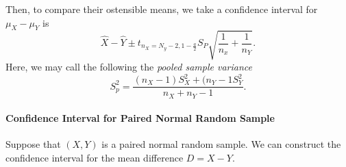 Then, to compare their ostensible means, we take a confidence interval for
\(\mu_X - \mu_Y\) is \[
  \hat{X} - \hat{Y} \pm t_{n_X = N_y - 2, 1 - \frac{a}{2}} S_P \sqrt{\frac{1}{n_x} + \frac{1}{n_Y}} 
.\] 
Here, we may call the following the \textit{pooled sample variance} \[
  S_p^2 = \frac{(n_X - 1)S^2_X + (n_Y - 1S^2_Y}{n_X + n_Y - 1}
.\] 

\paragraph{Confidence Interval for Paired Normal Random Sample}
Suppose that \((X, Y)\) is a paired normal random sample. We can construct the confidence interval
for the mean difference  \(D = X - Y\).

